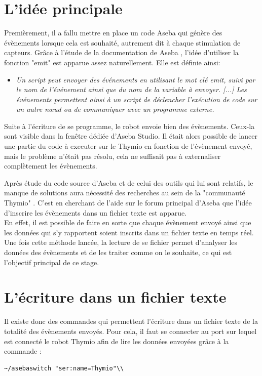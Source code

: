 \documentclass[a4paper, 12pt]{report}
\begin{document}
\section{L'idée principale}
Premièrement, il a fallu mettre en place un code Aseba \pageref{aseba} qui génère des évènements lorsque cela est souhaité, autrement dit à chaque stimulation de capteurs. Grâce à l'étude de la documentation de Aseba  \pageref{aseba}, l'idée d'utiliser la fonction "emit" est apparue assez naturellement. Elle est définie ainsi:

\begin{itemize}
\item{\textit{Un script peut envoyer des événements en utilisant le mot clé emit, suivi par le nom de l'événement ainsi que du nom de la variable à envoyer. [...] Les événements permettent ainsi à un script de déclencher l'exécution de code sur un autre nœud ou de communiquer avec un programme externe.}}
\end{itemize}

Suite à l'écriture de se programme, le robot envoie bien des évènements. Ceux-la sont visible dans la fenêtre dédiée d'Aseba Studio. Il était alors possible de lancer une partie du code à executer sur le Thymio \pageref{thymio} en fonction de l'évènement envoyé, mais le problème n'était pas résolu, cela ne suffisait pas à externaliser complètement les évènements.

Après étude du code source d'Aseba \cite{CodeASEBA} et de celui des outils qui lui sont relatifs, le manque de solutions aura nécessité des recherches au sein de la "communauté Thymio" \pageref{PhiloThymio}. C'est en cherchant de l'aide sur le forum principal d'Aseba que l'idée d'inscrire les évènements dans un fichier texte est apparue.\cite{ForumThymio}\\
En effet, il est possible de faire en sorte que chaque évènement envoyé ainsi que les données qui s'y rapportent soient inscrits dans un fichier texte en temps réel. Une fois cette méthode lancée, la lecture de se fichier permet d'analyser les données des évènements et de les traiter comme on le souhaite, ce qui est l'objectif principal de ce stage.

\section{L'écriture dans un fichier texte}
Il existe donc des commandes qui permettent l'écriture dans un fichier texte de la totalité des évènements envoyés. Pour cela, il faut se connecter au port sur lequel est connecté le robot Thymio afin de lire les données envoyées grâce à la commande :
\begin{verbatim}
~/asebaswitch "ser:name=Thymio"\\
\end{verbatim}
 
\end{document}
